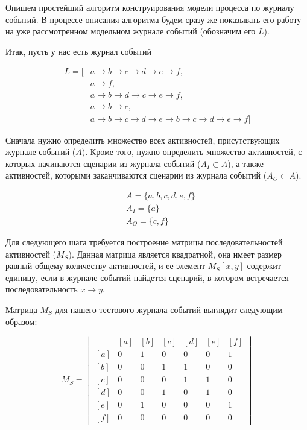 \documentclass[
11pt,%
tightenlines,%
twoside,%
onecolumn,%
nofloats,%
nobibnotes,%
nofootinbib,%
superscriptaddress,%
noshowpacs,%
centertags]%
{revtex4}
\begin{document}
Опишем простейший алгоритм конструирования модели процесса по журналу событий.
В процессе описания алгоритма будем сразу же показывать его работу на уже рассмотренном модельном журнале событий (обозначим его $L$).

Итак, пусть у нас есть журнал событий

\begin{equation}
\begin{aligned}
L = [
&{a \rightarrow b \rightarrow c \rightarrow d \rightarrow e \rightarrow f},\\
&{a \rightarrow f},\\
&{a \rightarrow b \rightarrow d \rightarrow c \rightarrow e \rightarrow f},\\
&{a \rightarrow b \rightarrow c},\\
&{a \rightarrow b \rightarrow c \rightarrow d \rightarrow e \rightarrow b \rightarrow c \rightarrow d \rightarrow e \rightarrow f}
]
\end{aligned}
\end{equation}

Сначала нужно определить множество всех активностей, присутствующих журнале событий ($A$).
Кроме того, нужно определить множество активностей, с которых начинаются сценарии из журнала событий ($A_I \subset A$), а также активностей, которыми заканчиваются сценарии из журнала событий ($A_O \subset A$).

\begin{equation}
\begin{aligned}
&A = \{a, b, c, d, e, f\} \\
&A_I = \{a\} \\
&A_O = \{c, f\}
\end{aligned}
\end{equation}

Для следующего шага требуется построение матрицы последовательностей активностей ($M_S$).
Данная матрица является квадратной, она имеет размер равный общему количеству активностей, и ее элемент $M_S[x, y]$ содержит единицу, если в журнале событий найдется сценарий, в котором встречается последовательность $x \rightarrow y$.

Матрица $M_S$ для нашего тестового журнала событий выглядит следующим образом:

\begin{equation}
M_S = \begin{vmatrix}
\ & [a] & [b] & [c] & [d] & [e] & [f] \\
[a] & 0 & 1 & 0 & 0 & 0 & 1 \\ 
[b] & 0 & 0 & 1 & 1 & 0 & 0 \\
[c] & 0 & 0 & 0 & 1 & 1 & 0 \\
[d] & 0 & 0 & 1 & 0 & 1 & 0 \\
[e] & 0 & 1 & 0 & 0 & 0 & 1 \\
[f] & 0 & 0 & 0 & 0 & 0 & 0
\end{vmatrix}
\end{equation}
\end{document}
